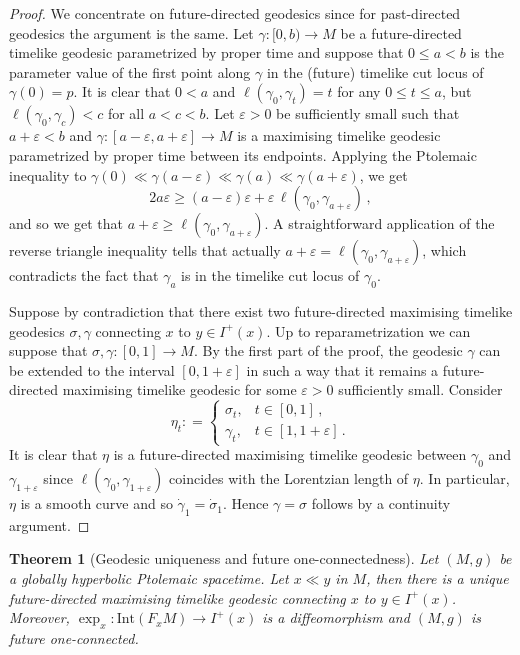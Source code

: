 \documentclass[hidelinks,12pt,a4paper]{article}
\numberwithin{equation}{section}
\theoremstyle{plain}
\newtheorem{theorem}[definition]{Theorem}
\theoremstyle{definition}
\newcommand{\Int}{\mathrm{Int}}
\begin{document}
\begin{proof}
We concentrate on future-directed geodesics since for past-directed geodesics the argument is the same. 
Let $\gamma :[0,b) \rightarrow M$ be a future-directed timelike geodesic parametrized by proper time and suppose that $0 \leq a < b$ is the parameter value of the first point along $\gamma$ in the (future) timelike cut locus of $\gamma(0) =p$. 
It is clear that $0<a$ and $\ell(\gamma_0, \gamma_t) = t$ for any $0 \leq t \leq a$, but 
$\ell(\gamma_0, \gamma_c) <c$ for all $a<c < b$. Let $\varepsilon>0$ be sufficiently small such that $a+ \varepsilon <b$ and $\gamma : [a- \varepsilon, a + \varepsilon ] \rightarrow M$ is a maximising timelike geodesic parametrized by proper time between its endpoints. 
Applying the Ptolemaic inequality to $\gamma(0) \ll \gamma(a-\varepsilon) \ll \gamma(a) \ll \gamma(a+ \varepsilon)$, we get
\[
2a \varepsilon \geq (a-\varepsilon) \varepsilon + \varepsilon \, \ell( \gamma_0, \gamma _{a+ \varepsilon}) \, ,
\]
and so we get that $a+ \varepsilon \geq \ell(\gamma_0, \gamma_{a+ \varepsilon})$. A straightforward application of the reverse triangle inequality tells that actually $a+ \varepsilon = \ell(\gamma_0, \gamma_{a+ \varepsilon})$, which contradicts the fact that $\gamma_a$ is in the timelike cut locus of $\gamma_0$. 

Suppose by contradiction that there exist two future-directed maximising timelike geodesics $\sigma, \gamma$ connecting $x$ to $y \in I^+(x)$. 
Up to reparametrization we can suppose that $\sigma, \gamma : [0,1] \rightarrow M$. 
By the first part of the proof, the geodesic $\gamma$ can be extended to the interval $[0, 1 + \varepsilon]$ in such a way that it remains a future-directed maximising timelike geodesic for some $\varepsilon >0$ sufficiently small. 
Consider
\[
\eta _t : = \begin{cases}
\sigma_t, & t \in [0,1] \, ,\\
\gamma_t, & t \in [1, 1+ \varepsilon] \, .
\end{cases}
\]
It is clear that $\eta$ is a future-directed maximising timelike geodesic between $\gamma_0$ and $\gamma _{1+ \varepsilon}$ since $\ell(\gamma_0, \gamma_{1+\varepsilon})$ coincides with the Lorentzian length of $\eta$. 
In particular, $\eta$ is a smooth curve and so $\dot \gamma _1= \dot \sigma _1$. Hence $\gamma= \sigma$ follows by a continuity argument.
\end{proof}

\begin{theorem}[Geodesic uniqueness and future one-connectedness]
\label{thm: future 1-connecedness}
Let $(M,g)$ be a globally hyperbolic Ptolemaic spacetime. Let $x \ll y$ in $M$, then there is a unique future-directed maximising timelike geodesic connecting $x$ to $y \in I^+(x)$. 
Moreover, $\exp_x : \Int (F_xM) \rightarrow I^+(x)$ is a diffeomorphism and $(M,g)$ is future one-connected. 
\end{theorem}
\end{document}
